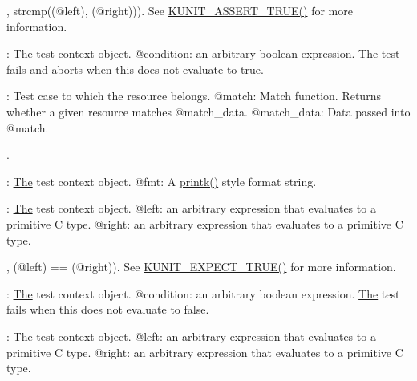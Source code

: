\begin{DoxyRefList}
\label{test__test000064}%
%
, strcmp((@left), (@right))). See \mbox{\hyperlink{test_8h_a70677d585b744aceaf5bff3b54da1ff7}{K\+U\+N\+I\+T\+\_\+\+A\+S\+S\+E\+R\+T\+\_\+\+T\+R\+U\+E()}} for more information.  
\item[Member \mbox{\hyperlink{test_8h_a70677d585b744aceaf5bff3b54da1ff7}{K\+U\+N\+I\+T\+\_\+\+A\+S\+S\+E\+R\+T\+\_\+\+T\+R\+UE}} (test, condition)]\label{test__test000052}%
%
\+: \mbox{\hyperlink{classThe}{The}} test context object. @condition\+: an arbitrary boolean expression. \mbox{\hyperlink{classThe}{The}} test fails and aborts when this does not evaluate to true. 
\item[Member \mbox{\hyperlink{kunit_2test_8c_acce70ae7b81ad1f13ed6d5fa4f7c5147}{kunit\+\_\+destroy\+\_\+resource}} (struct kunit $\ast$test, kunit\+\_\+resource\+\_\+match\+\_\+t match, void $\ast$match\+\_\+data)]\label{test__test000013}%
%
\+: Test case to which the resource belongs. @match\+: Match function. Returns whether a given resource matches @match\+\_\+data. @match\+\_\+data\+: Data passed into @match. 
\item[Member \mbox{\hyperlink{test_8h_a204ca9232db5c4f7ce43fc8fec69863b}{kunit\+\_\+err}} (test, fmt,...)]\label{test__test000024}%
%
.

\label{test__test000025}%
%
\+: \mbox{\hyperlink{classThe}{The}} test context object. @fmt\+: A \mbox{\hyperlink{linux_2printk_8h_ac002b290a55c356b2b46a7be61a791d4}{printk()}} style format string. 
\item[Member \mbox{\hyperlink{test_8h_ace9d5a2f9510ee6a6456ba5cb70a7847}{K\+U\+N\+I\+T\+\_\+\+E\+X\+P\+E\+C\+T\+\_\+\+EQ}} (test, left, right)]\label{test__test000030}%
%
\+: \mbox{\hyperlink{classThe}{The}} test context object. @left\+: an arbitrary expression that evaluates to a primitive C type. @right\+: an arbitrary expression that evaluates to a primitive C type.

\label{test__test000031}%
%
, (@left) == (@right)). See \mbox{\hyperlink{test_8h_a0dcf3441be7037d8702d620899bf33fa}{K\+U\+N\+I\+T\+\_\+\+E\+X\+P\+E\+C\+T\+\_\+\+T\+R\+U\+E()}} for more information.  
\item[Member \mbox{\hyperlink{test_8h_aabb1d94b55b8effa1bd7e707b40c92d8}{K\+U\+N\+I\+T\+\_\+\+E\+X\+P\+E\+C\+T\+\_\+\+F\+A\+L\+SE}} (test, condition)]\label{test__test000029}%
%
\+: \mbox{\hyperlink{classThe}{The}} test context object. @condition\+: an arbitrary boolean expression. \mbox{\hyperlink{classThe}{The}} test fails when this does not evaluate to false. 
\item[Member \mbox{\hyperlink{test_8h_a57c1ebf3a781ac1f6695709f62ed5ace}{K\+U\+N\+I\+T\+\_\+\+E\+X\+P\+E\+C\+T\+\_\+\+GE}} (test, left, right)]\label{test__test000044}%
%
\+: \mbox{\hyperlink{classThe}{The}} test context object. @left\+: an arbitrary expression that evaluates to a primitive C type. @right\+: an arbitrary expression that evaluates to a primitive C type.


\end{DoxyRefList}
